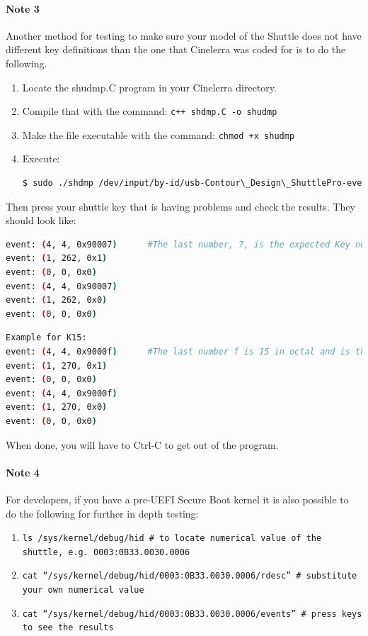\paragraph{Note 3}
Another method for testing to make sure your model of the Shuttle does not have different key definitions than the one that Cinelerra was coded for is to do the following.

\begin{enumerate}
    \item Locate the shudmp.C program in your Cinelerra directory.
    \item Compile that with the command:  \texttt{c++ shdmp.C -o shudmp}
    \item Make the file executable with the command:  \texttt{chmod +x shudmp}
    \item Execute:
    \begin{lstlisting}[language=Bash]
$ sudo ./shdmp /dev/input/by-id/usb-Contour\_Design\_ShuttlePro-event-if00 # substitute your shuttle
    \end{lstlisting}
\end{enumerate}

\noindent Then press your shuttle key that is having problems and check the results.  They should look like:

    \begin{lstlisting}[language=Bash, caption={Example for K7}]
event: (4, 4, 0x90007)		#The last number, 7, is the expected Key number. 
event: (1, 262, 0x1) 
event: (0, 0, 0x0) 
event: (4, 4, 0x90007) 
event: (1, 262, 0x0) 
event: (0, 0, 0x0) 
\end{lstlisting}
    \begin{lstlisting}[language=Bash, caption={Example for K15}]
Example for K15: 
event: (4, 4, 0x9000f)		#The last number f is 15 in octal and is the expected Key. 
event: (1, 270, 0x1) 
event: (0, 0, 0x0) 
event: (4, 4, 0x9000f) 
event: (1, 270, 0x0) 
event: (0, 0, 0x0)
\end{lstlisting}

\noindent When done, you will have to Ctrl-C to get out of the program.

\paragraph{Note 4} For developers, if you have a pre-UEFI Secure Boot kernel it is also possible to do the following for further in depth testing:

\begin{enumerate}
    \item \texttt{ls /sys/kernel/debug/hid   \# to locate numerical value of the shuttle, e.g. 0003:0B33.0030.0006}
    \item \texttt{cat “/sys/kernel/debug/hid/0003:0B33.0030.0006/rdesc”    \# substitute your own numerical value}
    \item \texttt{cat “/sys/kernel/debug/hid/0003:0B33.0030.0006/events”  \# press keys to see the results}
\end{enumerate}

